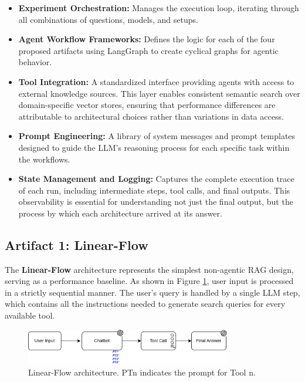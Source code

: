     \begin{itemize}
        \item \textbf{Experiment Orchestration:} Manages the execution loop, iterating through all combinations of questions, models, and setups.
        \item \textbf{Agent Workflow Frameworks:} Defines the logic for each of the four proposed artifacts using LangGraph to create cyclical graphs for agentic behavior.
        \item \textbf{Tool Integration:} A standardized interface providing agents with access to external knowledge sources. This layer enables consistent semantic search over domain-specific vector stores, ensuring that performance differences are attributable to architectural choices rather than variations in data access.
        \item \textbf{Prompt Engineering:} A library of system messages and prompt templates designed to guide the LLM's reasoning process for each specific task within the workflows.
        \item \textbf{State Management and Logging:} Captures the complete execution trace of each run, including intermediate steps, tool calls, and final outputs. This observability is essential for understanding not just the final output, but the process by which each architecture arrived at its answer.
    \end{itemize}


    \subsection{Artifact 1: Linear-Flow}

        The \textbf{Linear-Flow} architecture represents the simplest non-agentic RAG design, serving as a performance baseline. As shown in Figure \ref{fig:diagrama_linear_flow}, user input is processed in a strictly sequential manner. The user's query is handled by a single LLM step, which contains all the instructions needed to generate search queries for every available tool.
        
        \begin{figure}[h]
            \centering
            \includegraphics[width=0.8\textwidth]{images_exp2/diagrams/diagrama_linear_flow.png}
            \caption{Linear-Flow architecture. PTn indicates the prompt for Tool n.}
            \label{fig:diagrama_linear_flow}
        \end{figure}

